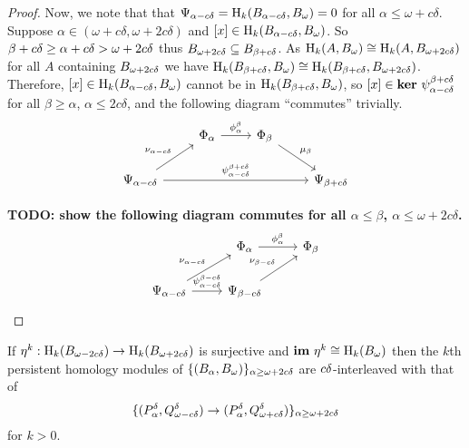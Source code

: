 \begin{proof}
  Now, we note that that $\Psi_{\alpha-c\delta} = \mathrm{H}_k(B_{\alpha-c\delta}, B_{\omega}) = 0$ for all $\alpha\leq \omega+c\delta$.
  Suppose $\alpha\in (\omega+c\delta, \omega+2c\delta)$ and $[x]\in\mathrm{H}_k(B_{\alpha-c{\delta}}, B_{\omega})$.
  So $\beta+c{\delta} \geq \alpha+c\delta > \omega +2c\delta$ thus $B_{\omega + 2c{\delta}}\subseteq B_{\beta+c{\delta}}$.
  As $\mathrm{H}_k(A, B_{\omega})\cong \mathrm{H}_k(A, B_{\omega + 2c{\delta}})$ for all $A$ containing $B_{\omega + 2c{\delta}}$ we have $\mathrm{H}_k(B_{\beta+c{\delta}}, B_{\omega})\cong\mathrm{H}_k(B_{\beta+c{\delta}}, B_{\omega + 2c{\delta}})$.
  Therefore, $[x]\in\mathrm{H}_k(B_{\alpha-c{\delta}}, B_{\omega})$ cannot be in $\mathrm{H}_k(B_{\beta+c{\delta}}, B_{\omega})$, so $[x]\in\mathbf{ker}~\psi_{\alpha-c{\delta}}^{\beta+c{\delta}}$ for all $\beta\geq\alpha$, $\alpha\leq 2c\delta$, and the following diagram ``commutes'' trivially.
  \begin{equation}\label{dgm:intrr2}\begin{tikzcd}
    & |[alias=Fa]|
    \Phi_\alpha  \arrow[to=Fb, "\phi_\alpha^\beta"]
    & |[alias=Fb]|
      \Phi_\beta  \arrow[to=Gb, "\mu_\beta"] & \\
    \Psi_{\alpha-c\of}  \arrow[to=Gb, "\psi_{\alpha-c\of}^{\beta+c\of}"]
                      \arrow[to=Fa, "\nu_{\alpha-c\of}"]
    & & & |[alias=Gb]|
      \Psi_{\beta + c\of}
  \end{tikzcd}\end{equation}

  \textbf{TODO: show the following diagram commutes for all $\alpha\leq\beta$, $\alpha\leq \omega + 2c\delta$.}
  \begin{equation}\label{dgm:intr4}\begin{tikzcd}
    & |[alias=Fa]|
    \Phi_\alpha  \arrow[to=Fb, "\phi_\alpha^\beta"]
    & |[alias=Fb]|
      \Phi_\beta\\
    \Psi_{\alpha-c\of}  \arrow[to=Gb, "\psi_{\alpha-c\of}^{\beta-c\of}"]
                      \arrow[to=Fa, "\nu_{\alpha-c\of}"]
    & |[alias=Gb]|
      \Psi_{\beta - c\of} \arrow[to=Fb, "\nu_{\beta-c\of}"]&
  \end{tikzcd}\end{equation}
\end{proof}

\begin{corollary}\label{cor:geo_inter}
  If $\eta^k : \mathrm{H}_k(B_{\omega - 2c{\delta}})\to \mathrm{H}_k(B_{\omega + 2c{\delta}})$ is surjective and $\mathbf{im}~\eta^k\cong \mathrm{H}_k(B_\omega)$ then the $k$th persistent homology modules of
  $\{(B_\alpha, B_\omega)\}_{\alpha\geq\omega + 2c{\delta}}$ are $c{\delta}$-interleaved with that of
  \[\{(P_\alpha^{\delta}, Q_{\omega - c{\delta}}^{\delta})\to (P_\alpha^{\delta}, Q_{\omega + c{\delta}}^{\delta})\}_{\alpha\geq\omega + 2c{\delta}}\]
  for $k > 0$.
\end{corollary}
